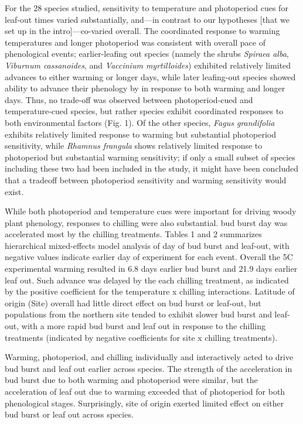 \documentclass[11pt]{article}
\begin{document}
For the 28 species studied, sensitivity to temperature and photoperiod cues for leaf-out times varied substantially, and---in contrast to our hypotheses [that we set up in the intro]---co-varied overall. The coordinated response to warming temperatures and longer photoperiod was consistent with overall pace of phenological events; earlier-leafing out species (namely the shrubs \emph{Spiraea alba}, \emph{Viburnum cassanoides}, and \emph{Vaccinium myrtilloides}) exhibited relatively limited advances to either warming or longer days, while later leafing-out species showed ability to advance their phenology by in response to both warming and longer days. Thus, no trade-off was observed between photoperiod-cued and temperature-cued species, but rather species exhibit coordinated responses to both environmental factors (Fig. 1). Of the other species, \emph{Fagus grandifolia} exhibits relatively limited response to warming but substantial photoperiod sensitivity, while \emph{Rhamnus frangula} shows relatively limited response to photoperiod but substantial warming sensitivity; if only a small subset of species including these two had been included in the study, it might have been concluded that a tradeoff between photoperiod sensitivity and warming sensitivity would exist. 

While both photoperiod and temperature cues were important for driving woody plant phenology, responses to chilling were also substantial. bud burst day was accelerated most by the chilling treatments. Tables 1 and 2 summarizes hierarchical mixed-effects model analysis of day of bud burst and leaf-out, with negative values indicate earlier day of experiment for each event. Overall the 5\degree C experimental warming resulted in 6.8 days earlier bud burst and 21.9 days earlier leaf out. Such advance was delayed by the each chilling treatment, as indicated by the positive coefficient for the temperature x chilling interactions. Latitude of origin (Site) overall had little direct effect on bud burst or leaf-out, but populations from the northern site tended to exhibit slower bud burst and leaf-out, with a more rapid bud burst and leaf out in response to the chilling treatments (indicated by negative coefficients for site x chilling treatments).

Warming, photoperiod, and chilling individually and interactively acted to drive bud burst and leaf out earlier across species. The strength of the acceleration in bud burst due to both warming and photoperiod were similar, but the acceleration of leaf out due to warming exceeded that of photoperiod for both phenological stages. Surprisingly, site of origin exerted limited effect on either bud burst or leaf out across species. 
\end{document}

